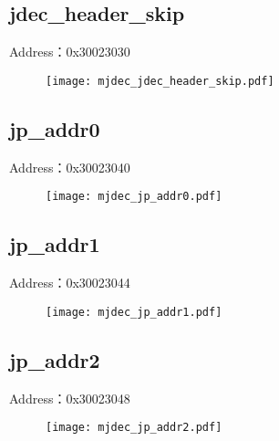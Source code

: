 \subsection{jdec\_header\_skip}
\label{mjdec-jdec-header-skip}
Address：0x30023030
 \begin{figure}[H]
\texttt{[image: mjdec\_jdec\_header\_skip.pdf]}
\end{figure}

\subsection{jp\_addr0}
\label{mjdec-jp-addr0}
Address：0x30023040
 \begin{figure}[H]
\texttt{[image: mjdec\_jp\_addr0.pdf]}
\end{figure}

\subsection{jp\_addr1}
\label{mjdec-jp-addr1}
Address：0x30023044
 \begin{figure}[H]
\texttt{[image: mjdec\_jp\_addr1.pdf]}
\end{figure}

\subsection{jp\_addr2}
\label{mjdec-jp-addr2}
Address：0x30023048
 \begin{figure}[H]
\texttt{[image: mjdec\_jp\_addr2.pdf]}
\end{figure}

